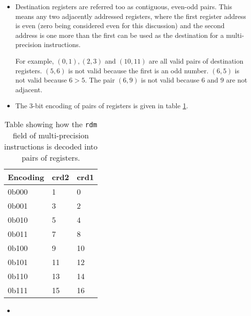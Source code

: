 \begin{itemize}
\item
Destination registers are referred too as contiguous, even-odd pairs.
This means any two adjacently addressed registers, where the
first register address is even (zero being considered even for this
discussion) and the second address is one more than the first can be
used as the destination for a multi-precision instructions.

For example, $(0,1), (2,3)$ and $(10,11)$ are all valid
pairs of destination registers.
$(5,6)$ is not valid because the first
is an odd number. $(6,5)$ is not valid because $6 > 5$.
The pair $(6,9)$
is not valid because $6$ and $9$ are not adjacent.

\item
The 3-bit encoding of pairs of registers is given in table 
\ref{tab:rdm-encodings}.
\end{itemize}

\begin{table}
\centering
\begin{tabular}{lll}
\hline
Encoding & crd2 & crd1 \\ \hline
0b000      & 1    & 0    \\
0b001      & 3    & 2    \\
0b010      & 5    & 4    \\
0b011      & 7    & 8    \\
0b100      & 9    & 10   \\
0b101      & 11   & 12   \\
0b110      & 13   & 14   \\
0b111      & 15   & 16   \\ \hline
\end{tabular}
\caption{
    Table showing how the {\tt rdm} field of multi-precision instructions
    is decoded into pairs of registers.
}
\label{tab:rdm-encodings}
\end{table}

\ienc{\iencaddtwomp}

\begin{itemize}
\item {}
\end{itemize}

